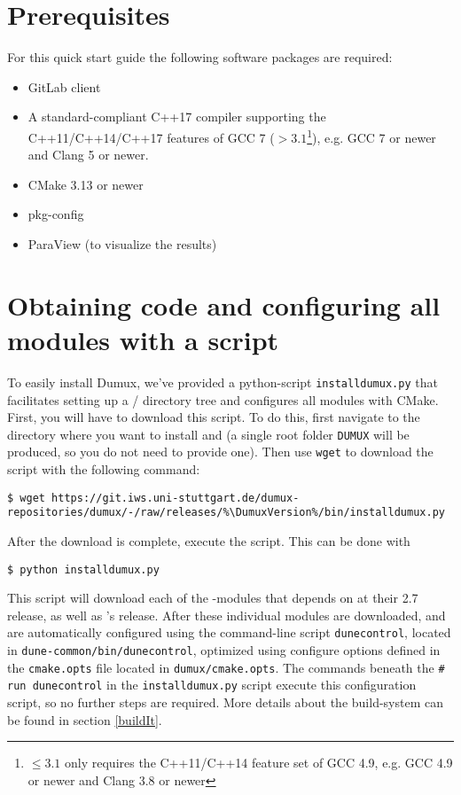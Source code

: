 \section{Prerequisites} \label{sec:prerequisites}
For this quick start guide the following software packages are required:
\begin{itemize}
\item GitLab client
\item A standard-compliant C++17 compiler supporting the C++11/C++14/C++17 features of GCC 7
(\Dumux $> 3.1$\footnote{\Dumux $\leq 3.1$ only requires the C++11/C++14 feature set of GCC 4.9,
e.g. GCC 4.9 or newer and Clang 3.8 or newer}), e.g. GCC 7 or newer and Clang 5 or newer.
\item CMake 3.13 or newer
\item pkg-config
\item ParaView (to visualize the results)
\end{itemize}

\section{Obtaining code and configuring all modules with a script}
To easily install Dumux, we've provided a python-script \texttt{installdumux.py} that facilitates
setting up a {\Dune}/{\Dumux} directory tree and configures all modules with CMake.
First, you will have to download this script. To do this, first navigate to the directory where you
want to install \Dumux and \Dune (a single root folder \texttt{DUMUX} will be produced, so you do
not need to provide one). Then use \texttt{wget} to download the script with the following command:
\begin{lstlisting}[style=Bash,escapechar=\%]
$ wget https://git.iws.uni-stuttgart.de/dumux-repositories/dumux/-/raw/releases/%\DumuxVersion%/bin/installdumux.py
\end{lstlisting}

After the download is complete, execute the script. This can be done with
\begin{lstlisting}[style=Bash]
$ python installdumux.py
\end{lstlisting}

This script will download each of the \Dune-modules that \Dumux depends on at their 2.7 release,
as well as \Dumux's \DumuxVersion{} release. After these individual modules are downloaded, \Dune and \Dumux
are automatically configured using the command-line script \texttt{dunecontrol}, located in
\texttt{dune-common/bin/dunecontrol}, optimized using configure options defined in the \texttt{cmake.opts}
file located in \texttt{dumux/cmake.opts}. The commands beneath the \texttt{\# run dunecontrol} in
the \texttt{installdumux.py} script execute this configuration script, so no further steps are required.
More details about the build-system can be found in section \ref{buildIt}.

